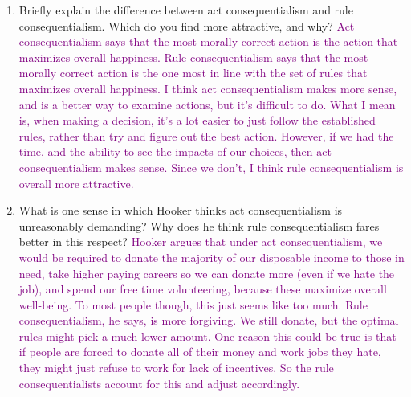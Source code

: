 \documentclass[12pt]{article}
\newcommand{\ans}[1]{\textcolor{purple}{#1}}
\begin{document}
\begin{enumerate}
    \item Briefly explain the difference between act consequentialism and rule consequentialism. Which do you find more attractive, and why?
    \ans{Act consequentialism says that the most morally correct action is the action that maximizes overall happiness. Rule consequentialism says that the most morally correct action is the one most in line with the set of rules that maximizes overall happiness. I think act consequentialism makes more sense, and is a better way to examine actions, but it's difficult to do. What I mean is, when making a decision, it's a lot easier to just follow the established rules, rather than try and figure out the best action. However, if we had the time, and the ability to see the impacts of our choices, then act consequentialism makes sense. Since we don't, I think rule consequentialism is overall more attractive.}

    \item What is one sense in which Hooker thinks act consequentialism is unreasonably demanding? Why does he think rule consequentialism fares better in this respect?
    \ans{Hooker argues that under act consequentialism, we would be required to donate the majority of our disposable income to those in need, take higher paying careers so we can donate more (even if we hate the job), and spend our free time volunteering, because these maximize overall well-being. To most people though, this just seems like too much. Rule consequentialism, he says, is more forgiving. We still donate, but the optimal rules might pick a much lower amount. One reason this could be true is that if people are forced to donate all of their money and work jobs they hate, they might just refuse to work for lack of incentives. So the rule consequentialists account for this and adjust accordingly.}
\end{enumerate}
\end{document}
